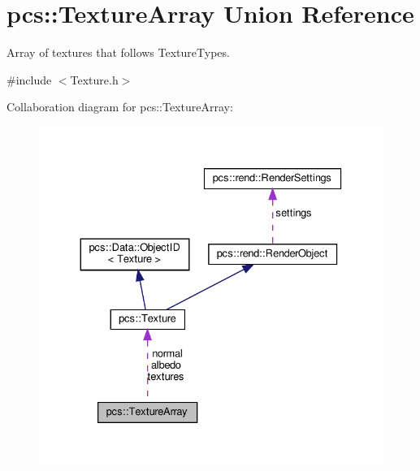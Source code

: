 \hypertarget{unionpcs_1_1TextureArray}{}\section{pcs\+:\+:Texture\+Array Union Reference}
\label{unionpcs_1_1TextureArray}


Array of textures that follows Texture\+Types.  




{\ttfamily \#include $<$Texture.\+h$>$}



Collaboration diagram for pcs\+:\+:Texture\+Array\+:
\nopagebreak
\begin{figure}[H]
\begin{center}
\leavevmode
\includegraphics[width=330pt]{unionpcs_1_1TextureArray__coll__graph}
\end{center}
\end{figure}
